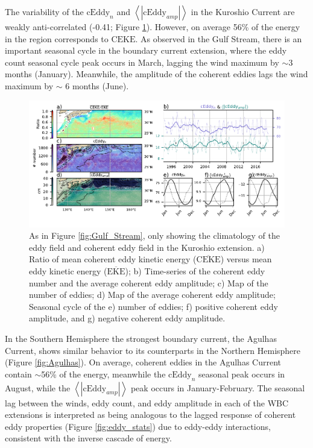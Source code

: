 \documentclass[draft,linenumbers]{agujournal2019}
\newcommand{\MEKE}{\overline{\textrm{EKE}}}
\newcommand{\MCEKE}{\overline{\textrm{CEKE}}}
\newcommand{\CEKE}{\textrm{CEKE}}
\newcommand{\cEddy}{\textrm{cEddy}}
\begin{document}
	The variability of the $\cEddy_{n}$ and $\left<|\cEddy_{amp}|\right>$ in the Kuroshio Current are weakly anti-correlated (-0.41; Figure \ref{fig:Kuroshio}). 
	However, on average 56\% of the energy in the region corresponds to $\CEKE$.
	As observed in the Gulf Stream, there is an important seasonal cycle in the boundary current extension, where the eddy count seasonal cycle peak occurs in March, lagging the wind maximum by $\sim$3 months (January). Meanwhile, the amplitude of the coherent eddies lags the wind maximum by $\sim$ 6 months (June). 

	\begin{figure}
	    \centering
	    \includegraphics[width=1\textwidth]{./figures/regional_ratios_and_stats_V3_4.pdf}
	    \caption{As in Figure \ref{fig:Gulf_Stream}, only showing the climatology of the eddy field and coherent eddy field in the Kuroshio extension. a) Ratio of mean coherent eddy kinetic energy ($\MCEKE$) versus mean eddy kinetic energy ($\MEKE$); b) Time-series of the coherent eddy number and the average coherent eddy amplitude; c) Map of the number of eddies; d) Map of the average coherent eddy amplitude; Seasonal cycle of the e) number of eddies; f) positive coherent eddy amplitude, and g) negative coherent eddy amplitude.}
	    \label{fig:Kuroshio}
	\end{figure}

	In the Southern Hemisphere the strongest boundary current, the Agulhas Current, shows similar behavior to its counterparts in the Northern Hemisphere (Figure \ref{fig:Agulhas}). On average, coherent eddies in the Agulhas Current contain $\sim$56\% of the energy, meanwhile the $\cEddy_{n}$ seasonal peak occurs in August, while the $\left<|\cEddy_{amp}|\right>$ peak occurs in January-February. 
	The seasonal lag between the winds, eddy count, and eddy amplitude in each of the WBC extensions is interpreted as being analogous to the lagged response of coherent eddy properties (Figure \ref{fig:eddy_stats}) due to eddy-eddy interactions, consistent with the inverse cascade of energy.
\end{document}
